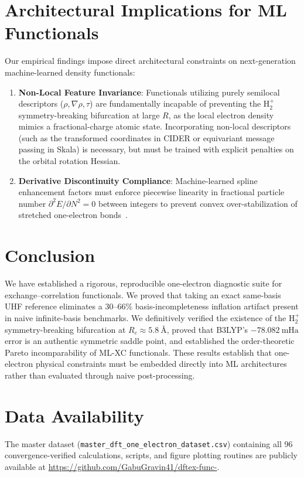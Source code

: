 \documentclass[journal]{IEEEtran}
\begin{document}
\section{Architectural Implications for ML Functionals}
\label{sec:architectural}

Our empirical findings impose direct architectural constraints on next-generation machine-learned density functionals:
\begin{enumerate}
\item \textbf{Non-Local Feature Invariance}: Functionals utilizing purely semilocal descriptors ($\rho, \nabla\rho, \tau$) are fundamentally incapable of preventing the $\text{H}_2^+$ symmetry-breaking bifurcation at large $R$, as the local electron density mimics a fractional-charge atomic state. Incorporating non-local descriptors (such as the transformed coordinates in CIDER or equivariant message passing in Skala) is necessary, but must be trained with explicit penalties on the orbital rotation Hessian.
\item \textbf{Derivative Discontinuity Compliance}: Machine-learned spline enhancement factors must enforce piecewise linearity in fractional particle number $\partial^2 E / \partial N^2 = 0$ between integers to prevent convex over-stabilization of stretched one-electron bonds~\cite{CMSY2008}.
\end{enumerate}

\section{Conclusion}
\label{sec:conclusion}
We have established a rigorous, reproducible one-electron diagnostic suite for exchange--correlation functionals. We proved that taking an exact same-basis UHF reference eliminates a 30--66\% basis-incompleteness inflation artifact present in naive infinite-basis benchmarks. We definitively verified the existence of the $\text{H}_2^+$ symmetry-breaking bifurcation at $R_c \approx 5.8\ \text{\AA}$, proved that B3LYP's $-78.082\ \text{mHa}$ error is an authentic symmetric saddle point, and established the order-theoretic Pareto incomparability of ML-XC functionals. These results establish that one-electron physical constraints must be embedded directly into ML architectures rather than evaluated through naive post-processing.

\section*{Data Availability}
The master dataset (\texttt{master\_dft\_one\_electron\_dataset.csv}) containing all 96 convergence-verified calculations, scripts, and figure plotting routines are publicly available at \url{https://github.com/GabuGravin41/dftex-func-}.
\end{document}
